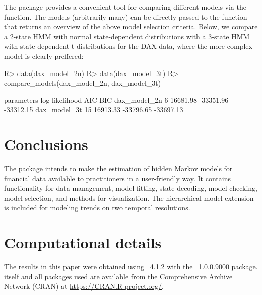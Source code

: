 \documentclass[article]{jss}
\newcommand{\fct}[1]{\code{#1()}}
\begin{document}
The  package provides a convenient tool for comparing different models via the \fct{compare\_models} function. The models (arbitrarily many) can be directly passed to the \fct{compare\_models} function that returns an overview of the above model selection criteria. Below, we compare a 2-state HMM with normal state-dependent distributions with a 3-state HMM with state-dependent t-distributions for the DAX data, where the more complex model is clearly preffered:

%
\begin{Schunk}
\begin{Sinput}
R> data(dax_model_2n)
R> data(dax_model_3t)
R> compare_models(dax_model_2n, dax_model_3t)
\end{Sinput}
\begin{Soutput}
             parameters log-likelihood       AIC       BIC
dax_model_2n          6       16681.98 -33351.96 -33312.15
dax_model_3t         15       16913.33 -33796.65 -33697.13
\end{Soutput}
\end{Schunk}
%



\section{Conclusions} \label{sec:conclusion}

The  package intends to make the estimation of hidden Markov models for financial data available to practitioners in a user-friendly way. It contains functionality for data management, model fitting, state decoding, model checking, model selection, and methods for visualization. The hierarchical model extension is included for modeling trends on two temporal resolutions. 


\section*{Computational details}

The results in this paper were obtained using
~4.1.2 with the
~1.0.0.9000 package.  itself
and all packages used are available from the Comprehensive
 Archive Network (CRAN) at \url{https://CRAN.R-project.org/}.
\end{document}
